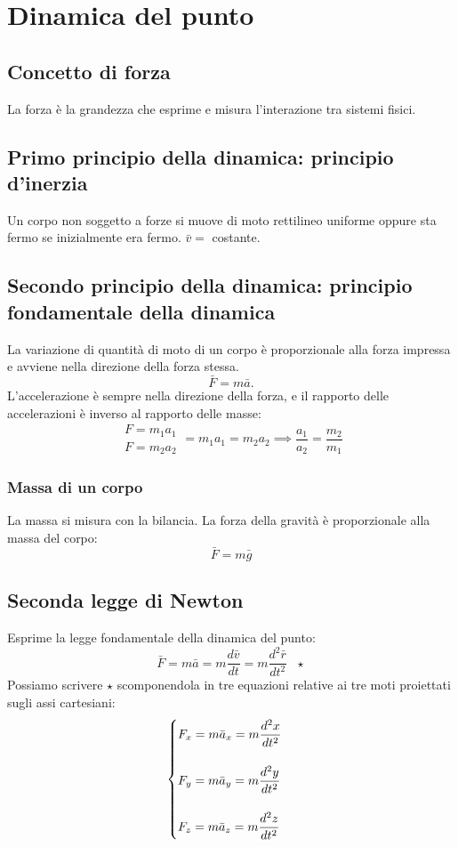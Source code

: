 \documentclass[../../main.tex]{subfiles}
\begin{document}
\section{Dinamica del punto}
\subsection{Concetto di forza}
La forza è la grandezza che esprime e misura l'interazione tra sistemi fisici.
\subsection{Primo principio della dinamica: principio d'inerzia}
Un corpo non soggetto a forze si muove di moto rettilineo uniforme oppure sta fermo se inizialmente era fermo. $\bar v =$ costante.
\subsection{Secondo principio della dinamica: principio fondamentale della dinamica}
La variazione di quantità di moto di un corpo è proporzionale alla forza impressa e avviene nella direzione della forza stessa. \[\bar F = m \bar a.\]
L'accelerazione è sempre nella direzione della forza, e il rapporto delle accelerazioni è inverso al rapporto delle masse:
\[
    \begin{array}{lr}
        F = m_1 a_1 \\
        F = m_2 a_2
    \end{array} = m_1 a_1 = m_2 a_2 \implies \frac{a_1}{a_2} = \frac{m_2}{m_1}
\]

\subsubsection{Massa di un corpo}
La massa si misura con la bilancia. La forza della gravità è proporzionale alla massa del corpo:
\[
    \bar F = m \bar g
\]
\subsection{Seconda legge di Newton}
Esprime la legge fondamentale della dinamica del punto:
\[
    \bar F = m\bar{a} = m\dfrac{d\bar v}{dt} = m\dfrac{d^2\bar{r}}{dt^2} \ \ \ \star
\]
Possiamo scrivere $\star$ scomponendola in tre equazioni relative ai tre moti proiettati sugli assi cartesiani:
\[
    \begin{cases}
        F_x = m\bar{a}_x = m\dfrac{d^2x}{dt^2} \\
        \vspace{1px}                           \\
        F_y = m\bar{a}_y = m\dfrac{d^2y}{dt^2} \\
        \vspace{1px}                           \\
        F_z = m\bar{a}_z = m\dfrac{d^2z}{dt^2}
    \end{cases}
\]
\end{document}
